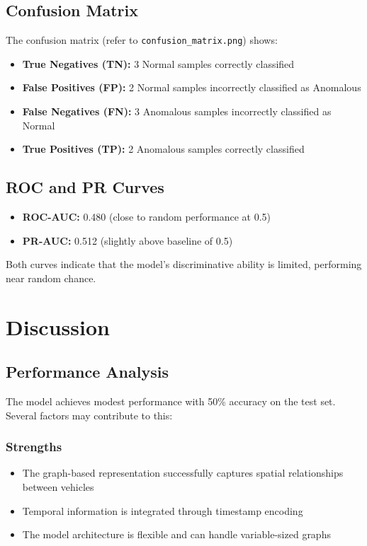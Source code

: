 \documentclass[11pt,a4paper]{article}
\begin{document}
\subsection{Confusion Matrix}

The confusion matrix (refer to \texttt{confusion\_matrix.png}) shows:
\begin{itemize}
    \item \textbf{True Negatives (TN):} 3 Normal samples correctly classified
    \item \textbf{False Positives (FP):} 2 Normal samples incorrectly classified as Anomalous
    \item \textbf{False Negatives (FN):} 3 Anomalous samples incorrectly classified as Normal
    \item \textbf{True Positives (TP):} 2 Anomalous samples correctly classified
\end{itemize}

\subsection{ROC and PR Curves}

\begin{itemize}
    \item \textbf{ROC-AUC:} 0.480 (close to random performance at 0.5)
    \item \textbf{PR-AUC:} 0.512 (slightly above baseline of 0.5)
\end{itemize}

Both curves indicate that the model's discriminative ability is limited, performing near random chance.

\section{Discussion}

\subsection{Performance Analysis}

The model achieves modest performance with 50\% accuracy on the test set. Several factors may contribute to this:

\subsubsection{Strengths}
\begin{itemize}
    \item The graph-based representation successfully captures spatial relationships between vehicles
    \item Temporal information is integrated through timestamp encoding
    \item The model architecture is flexible and can handle variable-sized graphs
\end{itemize}
\end{document}
